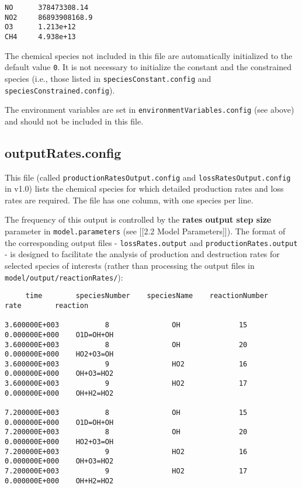 \begin{verbatim}
NO      378473308.14
NO2     86893908168.9
O3      1.213e+12
CH4     4.938e+13
\end{verbatim}

The chemical species not included in this file are automatically
initialized to the default value \texttt{0}. It is not necessary to
initialize the constant and the constrained species (i.e., those listed
in \texttt{speciesConstant.config} and
\texttt{speciesConstrained.config}).

The environment variables are set in
\texttt{environmentVariables.config} (see above) and should not be
included in this file.

\subsection{outputRates.config}\label{outputrates.config}

This file (called \texttt{productionRatesOutput.config} and
\texttt{lossRatesOutput.config} in v1.0) lists the chemical species for
which detailed production rates and loss rates are required. The file
has one column, with one species per line.

The frequency of this output is controlled by the \textbf{rates output
step size} parameter in \texttt{model.parameters} (see {[}{[}2.2 Model
Parameters{]}{]}). The format of the corresponding output files -
\texttt{lossRates.output} and \texttt{productionRates.output} - is
designed to facilitate the analysis of production and destruction rates
for selected species of interests (rather than processing the output
files in \texttt{model/output/reactionRates/}):

\begin{verbatim}
     time        speciesNumber    speciesName    reactionNumber         rate        reaction

3.600000E+003           8               OH              15         0.000000E+000    O1D=OH+OH
3.600000E+003           8               OH              20         0.000000E+000    HO2+O3=OH
3.600000E+003           9               HO2             16         0.000000E+000    OH+O3=HO2
3.600000E+003           9               HO2             17         0.000000E+000    OH+H2=HO2

7.200000E+003           8               OH              15         0.000000E+000    O1D=OH+OH
7.200000E+003           8               OH              20         0.000000E+000    HO2+O3=OH
7.200000E+003           9               HO2             16         0.000000E+000    OH+O3=HO2
7.200000E+003           9               HO2             17         0.000000E+000    OH+H2=HO2
\end{verbatim}

